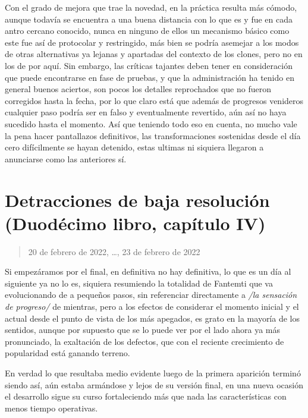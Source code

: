 \documentclass[
]{book}
\begin{document}
Con el grado de mejora que trae la novedad, en la práctica resulta más cómodo, aunque todavía se encuentra a una buena distancia con lo que es y fue en cada antro cercano conocido, nunca en ninguno de ellos un mecanismo básico como este fue así de protocolar y restringido, más bien se podría asemejar a los modos de otras alternativas ya lejanas y apartadas del contexto de los clones, pero no en los de por aquí. Sin embargo, las críticas tajantes deben tener en consideración que puede encontrarse en fase de pruebas, y que la administración ha tenido en general buenos aciertos, son pocos los detalles reprochados que no fueron corregidos hasta la fecha, por lo que claro está que además de progresos venideros cualquier paso podría ser en falso y eventualmente revertido, aún así no haya sucedido hasta el momento. Así que teniendo todo eso en cuenta, no mucho vale la pena hacer pantallazos definitivos, las transformaciones sostenidas desde el día cero difícilmente se hayan detenido, estas ultimas ni siquiera llegaron a anunciarse como las anteriores sí.

\hypertarget{detracciones-de-baja-resoluciuxf3n-duoduxe9cimo-libro-capuxedtulo-iv}{%
\section{Detracciones de baja resolución (Duodécimo libro, capítulo IV)}\label{detracciones-de-baja-resoluciuxf3n-duoduxe9cimo-libro-capuxedtulo-iv}}

\begin{quote}
20 de febrero de 2022, \ldots, 23 de febrero de 2022
\end{quote}

Si empezáramos por el final, en definitiva no hay definitiva, lo que es un día al siguiente ya no lo es, siquiera resumiendo la totalidad de Fantemti que va evolucionando de a pequeños pasos, sin referenciar directamente a \emph{/la sensación de progreso/} de mientras, pero a los efectos de considerar el momento inicial y el actual desde el punto de vista de los más apegados, es grato en la mayoría de los sentidos, aunque por supuesto que se lo puede ver por el lado ahora ya más pronunciado, la exaltación de los defectos, que con el reciente crecimiento de popularidad está ganando terreno.

En verdad lo que resultaba medio evidente luego de la primera aparición terminó siendo así, aún estaba armándose y lejos de su versión final, en una nueva ocasión el desarrollo sigue su curso fortaleciendo más que nada las características con menos tiempo operativas.
\end{document}

